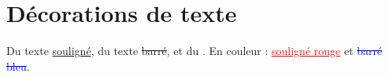 \documentclass{article}
\begin{document}
\hsize=380pt
\section{D\'ecorations de texte}
Du texte \underline{soulign\'e}, du texte \sout{barr\'e}, et du
. En couleur :
\textcolor{red}{\underline{soulign\'e rouge}} et
\textcolor{blue}{\sout{barr\'e bleu}}.
\end{document}
